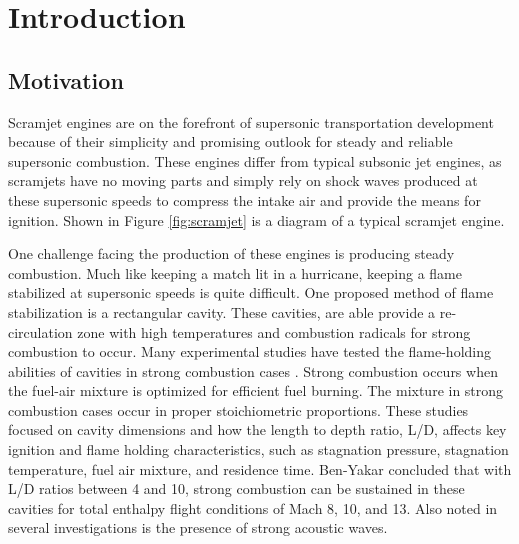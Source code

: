 
\chapter{Introduction} %

\label{Chapter2} %



\section{Motivation}

Scramjet engines are on the forefront of supersonic transportation development because of their simplicity and promising outlook for steady and reliable supersonic combustion. These engines differ from typical subsonic jet engines, as scramjets have no moving parts and simply rely on shock waves produced at these supersonic speeds to compress the intake air and provide the means for ignition. Shown in Figure \ref{fig:scramjet} is a diagram of a typical scramjet engine.

One challenge facing the production of these engines is producing steady combustion. Much like keeping a match lit in a hurricane, keeping a flame stabilized at supersonic speeds is quite difficult. One proposed method of flame stabilization is a rectangular cavity. These cavities, are able provide a re-circulation zone with high temperatures and combustion radicals for strong combustion to occur. Many experimental studies have tested the flame-holding abilities of cavities in strong combustion cases \cite{ben2000experimental,ben2001cavity,do2009plasma,yilmaz2013investigation}. Strong combustion occurs when the fuel-air mixture is optimized for efficient fuel burning. The mixture in strong combustion cases occur in proper stoichiometric proportions. These studies focused on cavity dimensions and how the length to depth ratio, L/D, affects key ignition and flame holding characteristics, such as stagnation pressure, stagnation temperature, fuel air mixture, and residence time. Ben-Yakar concluded that with L/D ratios between 4 and 10, strong combustion can be sustained in these cavities for total enthalpy flight conditions of Mach 8, 10, and 13\cite{ben2001cavity}. Also noted in several investigations is the presence of strong acoustic waves\cite{unalmis2004cavity,heller1996letter,williams2007supersonic, mcgregor1970drag,luo2011drag, sato1999advanced}. 

